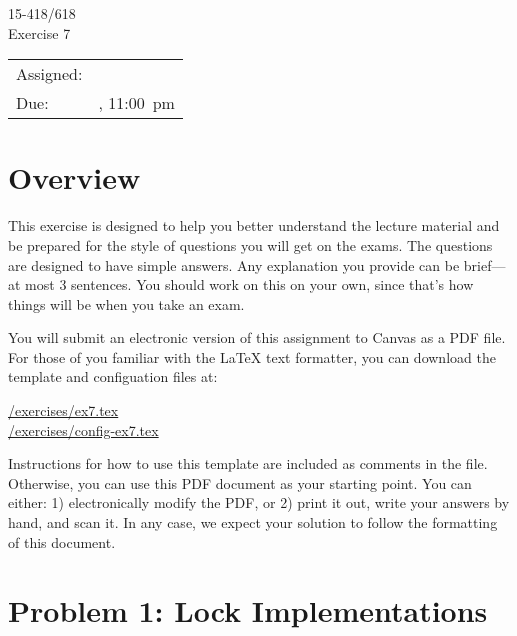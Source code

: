 \documentclass[11pt]{article}
\newcommand{\cref}[2]{\href{#1}{\color{blue}#2}}
\begin{document}
                          
\vspace*{0.3in}                            
\begin{center}
\LARGE
15-418/618 \thisterm{} \\
Exercise 7
\end{center}

\begin{center}
\Large        
\begin{tabular}{ll}
\hline             
Assigned: & \dateassigned{}  \\
Due: &  \datedue{}, 11:00~pm  \\
\hline       
\end{tabular}
\end{center} 

\section*{Overview}

This exercise is designed to help you better understand the lecture
material and be prepared for the style of questions you will get on
the exams.  The questions are designed to have simple answers.  Any
explanation you provide can be brief---at most 3 sentences.  You
should work on this on your own, since that's how things will be when
you take an exam.

You will submit an electronic version of this assignment to Canvas 
as a PDF file.  For those of you familiar with the \LaTeX{} text 
formatter, you can download the template and configuation files at: 
\begin{center} 
  \cref{\actualcoursehome/exercises/ex7.tex}{\visiblecoursehome/exercises/ex7.tex}\\
  \cref{\actualcoursehome/exercises/config-ex7.tex}{\visiblecoursehome/exercises/config-ex7.tex}
\end{center} 
Instructions for how to use this template are included as comments in 
the file.  Otherwise, you can use this PDF document as your starting 
point.  You can either: 1) electronically modify the PDF, or 2) print 
it out, write your answers by hand, and scan it.  In any case, we 
expect your solution to follow the formatting of this document. 

\newpage 

\section*{Problem 1: Lock Implementations}
\end{document}

